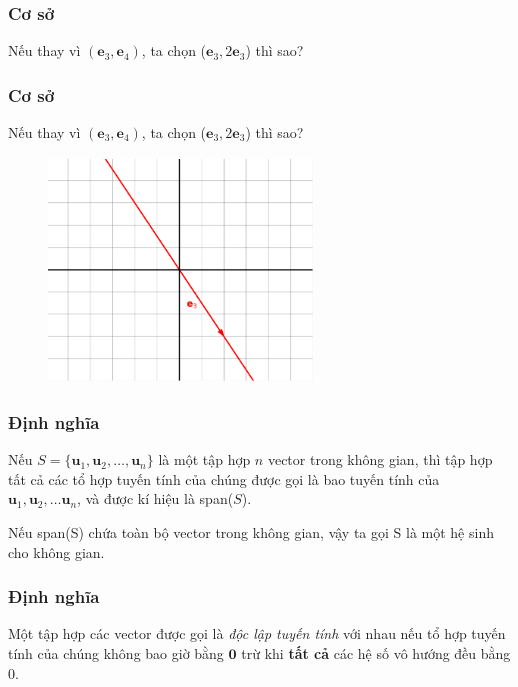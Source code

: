 \begin{frame}
    \frametitle{Cơ sở}
    Nếu thay vì \((\mathbf{e}_3 ,\mathbf{e}_4)\), ta chọn (\(\mathbf{e}_3 ,2\mathbf{e}_3\)) thì sao?
\end{frame}
\begin{frame}
    \frametitle{Cơ sở}
    Nếu thay vì \((\mathbf{e}_3 ,\mathbf{e}_4)\), ta chọn (\(\mathbf{e}_3 ,2\mathbf{e}_3\)) thì sao?
    \begin{figure}[H]
        \centering
        \includegraphics[width=7cm, height=6cm]{Slides/Figure/avectoronaline.png}
    \end{figure}
\end{frame}
\begin{frame}
    \frametitle{Định nghĩa}
    \begin{tcolorbox}[colback=blue!10!, colframe=blue!50!black, title=Bao tuyến tính]
        Nếu \(S=\{\mathbf{u}_{1}, \mathbf{u}_{2},\dots,  \mathbf{u}_{n}\}\) là một tập hợp \(n\) vector trong không gian, thì tập hợp tất cả các tổ hợp tuyến tính của chúng được gọi là bao tuyến tính của \(\mathbf{u}_{1}, \mathbf{u}_{2},\dots \mathbf{u}_{n}\), và được kí hiệu là span(\(S\)).
       \vspace{8pt}

        Nếu span(S) chứa toàn bộ vector trong không gian, vậy ta gọi S là một hệ sinh cho không gian.
    \end{tcolorbox}
\end{frame}
\begin{frame}
\frametitle{Định nghĩa}
    \begin{tcolorbox}[colback=blue!10!, colframe=blue!50!black, title=Độc lập tuyến tính]
        Một tập hợp các vector được gọi là \emph{độc lập tuyến tính} với nhau nếu tổ hợp tuyến tính của chúng không bao giờ bằng \(\mathbf{0}\) trừ khi \textbf{tất cả} các hệ số vô hướng đều bằng \(0\).
    \end{tcolorbox}
\end{frame}
